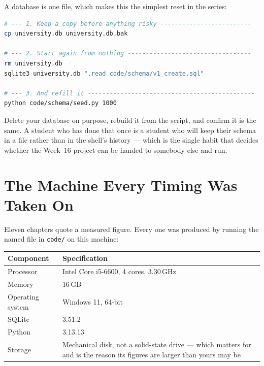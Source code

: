 A database is one file, which makes this the simplest reset in the series:

\begin{lstlisting}[language=bash]
# --- 1. Keep a copy before anything risky -------------------------
cp university.db university.db.bak

# --- 2. Start again from nothing ----------------------------------
rm university.db
sqlite3 university.db ".read code/schema/v1_create.sql"

# --- 3. And refill it ----------------------------------------------
python code/schema/seed.py 1000
\end{lstlisting}

\begin{conceptbox}
Delete your database on purpose, rebuild it from the script, and confirm it is
the same. A student who has done that once is a student who will keep their
schema in a file rather than in the shell's history --- which is the single
habit that decides whether the Week~16 project can be handed to somebody else
and run.
\end{conceptbox}

\section{The Machine Every Timing Was Taken On}

Eleven chapters quote a measured figure. Every one was produced by running the
named file in \texttt{code/} on this machine:

\begin{longtable}{@{}L{3.6cm}L{11.0cm}@{}}
\toprule
{}
\textbf{Component} & \textbf{Specification} \\
\midrule
\endhead
Processor & Intel Core i5-6600, 4 cores, 3.30\,GHz \\
Memory & 16\,GB \\
Operating system & Windows 11, 64-bit \\
SQLite & 3.51.2 \\
Python & 3.13.13 \\
Storage & Mechanical disk, not a solid-state drive --- which matters for
 and is the reason its figures are larger than yours may be \\
\bottomrule
\end{longtable}

